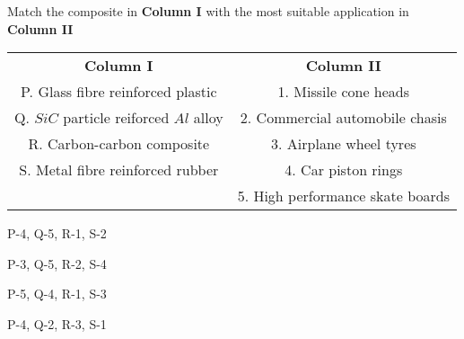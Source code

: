     \item Match the composite in \textbf{Column I} with the most suitable application in 
        \textbf{Column II}
        \begin{center}
            \begin{tabular}{| c | c |}
                \hline
                \textbf{Column I}  & \textbf{Column II}\\
                P. Glass fibre reinforced plastic & 1.  Missile cone heads\\
                \hline
                Q. $SiC$ particle reiforced $Al$ alloy & 2.  Commercial automobile chasis\\
                \hline
                R. Carbon-carbon composite & 3. Airplane wheel tyres\\
                \hline
                S. Metal fibre reinforced rubber & 4. Car piston rings\\
                \hline
                \quad & 5. High performance skate boards\\

                \hline
            \end{tabular} 
        \end{center}

        \hfill{}
        \begin{enumerate}
                \begin{multicols}{2}
                \item P-4, Q-5, R-1, S-2 \columnbreak 
                \item P-3, Q-5, R-2, S-4 
                \end{multicols} 
                \begin{multicols}{2}
                \item P-5, Q-4, R-1, S-3 \columnbreak 
                \item P-4, Q-2, R-3, S-1
                \end{multicols}
        \end{enumerate}

